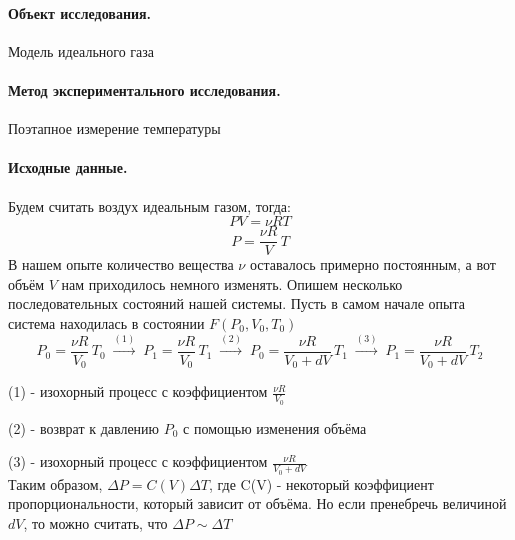 \documentclass{article}
\begin{document}
	\paragraph{Объект исследования.} Модель идеального газа
	\paragraph{Метод экспериментального исследования.} Поэтапное измерение температуры
	\paragraph{Исходные данные.}
	Будем считать воздух идеальным газом, тогда:
	$$PV=\nu RT $$
	$$ P=\frac{\nu R}{V}\,T$$
	В нашем опыте количество вещества $\nu$ оставалось примерно постоянным, а вот объём $V$ нам приходилось немного изменять. Опишем несколько последовательных состояний нашей системы.
	Пусть в самом начале опыта система находилась в состоянии $F(P_0,V_0,T_0)$
	$$ P_0=\frac{\nu R}{V_0}\,T_0\; \xrightarrow{(1)} \; P_1=\frac{\nu R}{V_0}\,T_1 \;\xrightarrow{(2)}\; P_0=\frac{\nu R}{V_0+dV}\,T_1 \;\xrightarrow{(3)} \; P_1=\frac{\nu R}{V_0+dV}\,T_2$$
	
	(1) - изохорный процесс с коэффициентом $ \frac{\nu R}{V_0} $
	
	(2) - возврат к давлению $P_0$ с помощью изменения объёма
	
	(3) - изохорный процесс с коэффициентом $ \frac{\nu R}{V_0+dV} $\\
	
	Таким образом, $\Delta P=C(V)\Delta T$, где C(V) - некоторый коэффициент пропорциональности, который зависит от объёма. Но если пренебречь величиной $dV$, то можно считать, что $\Delta P \sim \Delta T$\\
	
\end{document}
